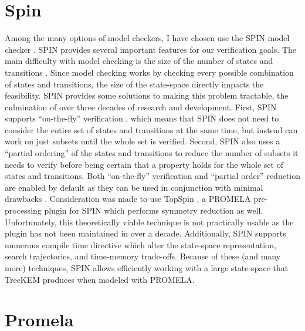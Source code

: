 \hypertarget{spin}{%
\section{Spin}\label{spin}}

Among the many options of model checkers, I have chosen use the SPIN model checker \autocite{godefroid1990using, holzmann1997model}.
SPIN provides several important features for our verification goals.
The main difficulty with model checking is the size of the number of states and transitions \autocite{burch1992symbolic}.
Since model checking works by checking every possible combination of states and transitions, the size of the state-space directly impacts the feasibility.
SPIN provides some solutions to making this problem tractable, the culmination of over three decades of research and development.
First, SPIN supports ``on-the-fly'' verification \autocite{rudin1987limits}, which means that SPIN does not need to consider the entire set of states and transitions at the same time, but instead can work on just subsets until the whole set is verified.
Second, SPIN also uses a ``partial ordering'' of the states and transitions \autocite{shannon1958note} to reduce the number of subsets it needs to verify before being certain that a property holds for the whole set of states and transitions.
Both ``on-the-fly'' verification and ``partial order'' reduction are enabled by default as they can be used in conjunction with minimal drawbacks \autocite{valmari1993fly, peled1994combining, holzmann1995improvement, couvreur1999fly}.
Consideration was made to use TopSpin \autocite{DonaldsonM_AMAST2006}, a PROMELA pre-processing plugin for SPIN which performs symmetry reduction as well.
Unfortunately, this theoretically viable technique is not practically usable as the plugin has not been maintained in over a decade.
Additionally, SPIN supports numerous compile time directive which alter the state-space representation, search trajectories, and time-memory trade-offs.
Because of these (and many more) techniques, SPIN allows efficiently working with a large state-space that TreeKEM produces when modeled with PROMELA.\@


\hypertarget{sec:promela}{%
\section{Promela}\label{sec:promela}}

